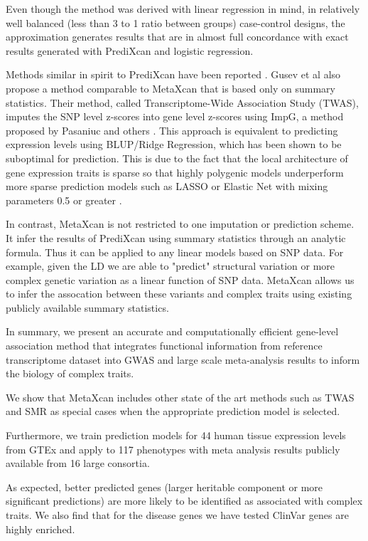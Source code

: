 \documentclass[10pt]{article}
\begin{document}
Even though the method was derived with linear regression in mind, in relatively well balanced (less than 3 to 1 ratio between groups) case-control designs, the approximation generates results that are in almost full concordance with exact results generated with PrediXcan and logistic regression.

Methods similar in spirit to PrediXcan have been reported \cite{Gusev2016}. Gusev et al also propose a method comparable to MetaXcan that is based only on summary statistics. Their method, called Transcriptome-Wide Association Study (TWAS), imputes the SNP level z-scores into gene level z-scores using ImpG, a method proposed by Pasaniuc and others \cite{Pasaniuc2014}. This approach is equivalent to predicting expression levels using BLUP/Ridge Regression, which has been shown to be suboptimal for prediction. This is due to the fact that the local architecture of gene expression traits is sparse so that highly polygenic models underperform more sparse prediction models such as LASSO or Elastic Net with mixing parameters 0.5 or greater \cite{Wheeler2016}.

In contrast, MetaXcan is not restricted to one imputation or prediction scheme. It
infer the results of PrediXcan using summary statistics through an analytic formula. Thus it can be applied to any linear models based on SNP data. For example, given the LD we are able to "predict" structural variation or more complex genetic variation as a linear function of SNP data. MetaXcan allows us to infer the assocation between these variants and complex traits using existing publicly available summary statistics.

In summary, we present an accurate and computationally efficient gene-level association method that integrates functional information from reference transcriptome dataset into GWAS and large scale meta-analysis results to inform the biology of complex traits.

We show that MetaXcan includes other state of the art methods such as TWAS and SMR as special cases when the appropriate prediction model is selected.

Furthermore, we train prediction models for 44 human tissue expression levels from GTEx and apply to 117 phenotypes with meta analysis results publicly available from 16 large consortia. 

As expected, better predicted genes (larger heritable component or more significant predictions) are more likely to be identified as associated with complex traits. We also find that for the disease genes we have tested ClinVar genes are highly enriched.
\end{document}
